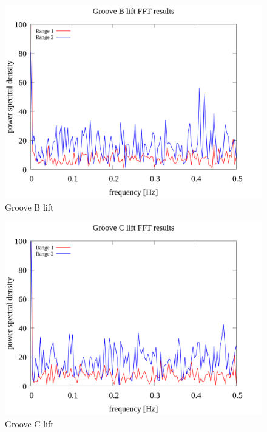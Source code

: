 \documentclass[a4paper]{jsarticle}
\begin{document}
\begin{figure}[htbp]
    \footnotesize
    \begin{center}
        \includegraphics[width=130mm]{../images/Groove_B_lift_08.png}
        \caption{Groove B lift}
    \end{center}
\end{figure}

\begin{figure}[htbp]
    \footnotesize
    \begin{center}
        \includegraphics[width=130mm]{../images/Groove_C_lift_08.png}
        \caption{Groove C lift}
    \end{center}
\end{figure}
\end{document}
